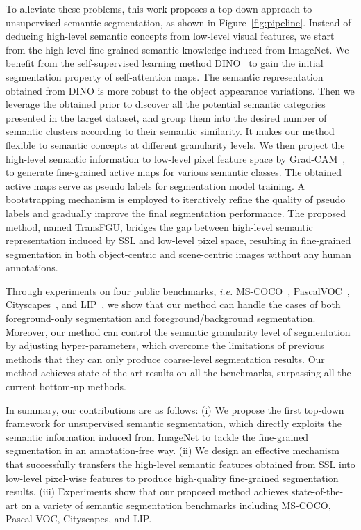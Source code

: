 \documentclass[runningheads]{llncs}
\def\ie{\emph{i.e. }}
\newcommand{\figref}[1]{Figure~\ref{#1}}
\begin{document}
To alleviate these problems, this work proposes a top-down approach to unsupervised semantic segmentation, as shown in \figref{fig:pipeline}. Instead of deducing high-level semantic concepts from low-level visual features, we start from the high-level fine-grained semantic knowledge induced from ImageNet. We benefit from the self-supervised learning method DINO~\cite{DINO} to gain the initial segmentation property of self-attention maps. The semantic representation obtained from DINO is more robust to the object appearance variations. Then we leverage the obtained prior to discover all the potential semantic categories presented in the target dataset, and group them into the desired number of semantic clusters according to their semantic similarity. It makes our method flexible to semantic concepts at different granularity levels. We then project the high-level semantic information to low-level pixel feature space by Grad-CAM~\cite{selvaraju2017gradcam,zou2020pseudoseg,shi2021zoomcam}, to generate fine-grained active maps for various semantic classes. The obtained active maps serve as pseudo labels for segmentation model training. A bootstrapping mechanism is employed to iteratively refine the quality of pseudo labels and gradually improve the final segmentation performance. The proposed method, named TransFGU, bridges the gap between high-level semantic representation induced by SSL and low-level pixel space, resulting in fine-grained segmentation in both object-centric and scene-centric images without any human annotations.


Through experiments on four public benchmarks, \ie MS-COCO~\cite{lin2014mscoco}, PascalVOC~\cite{everingham2010pascalvoc}, Cityscapes~\cite{cordts2016cityscapes}, and LIP~\cite{gong2017lip}, we show that our method can handle the cases of both  foreground-only segmentation  and foreground/background segmentation. Moreover, our method can control the semantic granularity level of segmentation by adjusting hyper-parameters, which overcome the limitations of previous methods that they can only produce coarse-level segmentation results. Our method achieves state-of-the-art results on all the benchmarks, surpassing all the current bottom-up methods.

In summary, our contributions are as follows: (i) We propose the first top-down framework for unsupervised semantic segmentation, which directly exploits the semantic information induced from ImageNet to tackle the fine-grained segmentation in an annotation-free way. (ii) We design an effective mechanism that successfully transfers the high-level semantic features obtained from SSL into low-level pixel-wise features to produce high-quality fine-grained segmentation results. (iii) Experiments show that our proposed method achieves state-of-the-art on a variety of semantic segmentation benchmarks including  MS-COCO, Pascal-VOC, Cityscapes, and LIP.
\end{document}
